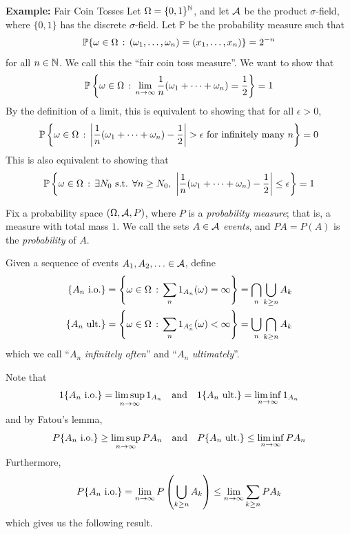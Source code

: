 \begin{example}{\textbf{Example:} Fair Coin Tosses}
    Let $\Omega = \{0, 1\}^{\N}$, and let $\cal{A}$ be the product $\sigma$-field, where $\{0, 1\}$ has the discrete $\sigma$-field. Let $\mathbb{P}$ be the probability measure such that
    \[ \mathbb{P}\{\omega \in \Omega \col (\omega_1, \ldots, \omega_n) = (x_1, \ldots, x_n)\} = 2^{-n} \]
    for all $n \in \N$. We call this the ``fair coin toss measure''. We want to show that
    \[ \mathbb{P}\left\{\omega \in \Omega \col \lim_{n \to \infty} \frac{1}{n}(\omega_1 + \cdots + \omega_n) = \frac{1}{2}\right\} = 1 \]
    By the definition of a limit, this is equivalent to showing that for all $\epsilon > 0$,
    \[ \mathbb{P}\left\{\omega \in \Omega \col \abs{\frac{1}{n}(\omega_1 + \cdots + \omega_n) - \frac{1}{2}} > \epsilon \tt{ for infinitely many } n\right\} = 0 \]
    This is also equivalent to showing that
    \[ \mathbb{P}\left\{\omega \in \Omega \col \exists N_0 \tt{ s.t. } \forall n \geq N_0,\ \abs{\frac{1}{n}(\omega_1 + \cdots + \omega_n) - \frac{1}{2}} \leq \epsilon\right\} = 1 \]
\end{example}

\begin{definition}
    Fix a probability space $(\Omega, \cal{A}, P)$, where $P$ is a \emph{probability measure}; that is, a measure with total mass $1$. We call the sets $A \in \cal{A}$ \emph{events}, and $PA = P(A)$ is the \emph{probability} of $A$.
\end{definition}

\begin{definition}
    Given a sequence of events $A_1, A_2, \ldots \in \cal{A}$, define
    \begin{align*}
        \{A_n \tt{ i.o.}\} &= \left\{\omega \in \Omega \col \sum_{n} 1_{A_n}(\omega) = \infty\right\} = \bigcap_{n} \bigcup_{k \geq n} A_k\\
        \{A_n \tt{ ult.}\} &= \left\{\omega \in \Omega \col \sum_{n} 1_{A_n^{c}}(\omega) < \infty\right\} = \bigcup_{n} \bigcap_{k \geq n} A_k
    \end{align*}
    which we call ``$A_n$ \emph{infinitely often}'' and ``$A_n$ \emph{ultimately}''.
\end{definition}

Note that
\[ 1\{A_n \tt{ i.o.}\} = \limsup_{n \to \infty} 1_{A_n} \quand 1\{A_n \tt{ ult.}\} = \liminf_{n \to \infty} 1_{A_n} \]
and by Fatou's lemma,
\[ P\{A_n \tt{ i.o.}\} \geq \limsup_{n \to \infty} PA_n \quand P\{A_n \tt{ ult.}\} \leq \liminf_{n \to \infty} PA_n \]
Furthermore,
\[ P\{A_n \tt{ i.o.}\} = \lim_{n \to \infty} P\left(\bigcup_{k \geq n} A_k\right) \leq \lim_{n \to \infty} \sum_{k \geq n} PA_k \]
which gives us the following result.

